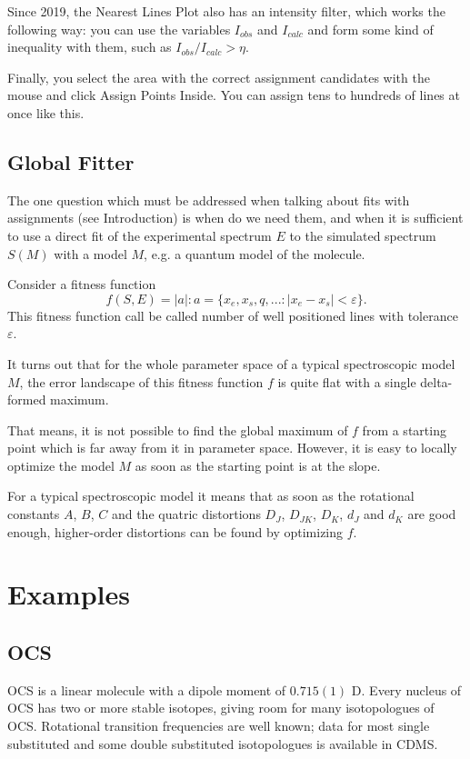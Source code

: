 \documentclass[11pt]{article}
\begin{document}
Since 2019, the Nearest Lines Plot also has an intensity filter, which works the following way: you can use the variables $I_{obs}$ and $I_{calc}$ and form some kind of inequality with them, such as $I_{obs} / I_{calc} > \eta$.

Finally, you select the area with the correct assignment candidates with the mouse and click Assign Points Inside. You can assign tens to hundreds of lines at once like this. 

\subsection{Global Fitter}

The one question which must be addressed when talking about fits with assignments (see Introduction) is when do we need them, and when it is sufficient to use a direct fit of the experimental spectrum $E$ to the simulated spectrum $S(M)$ with a model $M$, e.g. a quantum model of the molecule.

Consider a fitness function 
\begin{equation}
    f(S, E) = |a|: a = \{x_e, x_s, q, ...: |x_e - x_s| < \varepsilon\}.
\end{equation}
This fitness function call be called number of well positioned lines with tolerance $\varepsilon$.

It turns out that for the whole parameter space of a typical spectroscopic model $M$, the error landscape of this fitness function $f$ is quite flat with a single delta-formed maximum. 

That means, it is not possible to find the global maximum of $f$ from a starting point which is far away from it in parameter space. However, it is easy to locally optimize the model $M$ as soon as the starting point is at the slope. 

For a typical spectroscopic model it means that as soon as the rotational constants $A$, $B$, $C$ and the quatric distortions $D_J$, $D_{JK}$, $D_K$, $d_J$ and $d_K$ are good enough, higher-order distortions can be found by optimizing $f$.


\section{Examples}
\subsection{OCS}

OCS is a linear molecule with a dipole moment of $0.715(1)$ D. Every nucleus of OCS has two or more stable isotopes, giving room for many isotopologues of OCS. Rotational transition frequencies are well known; data for most single substituted and some double substituted isotopologues is available in CDMS.
\end{document}
